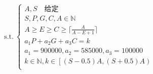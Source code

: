 \documentclass[preview]{standalone}
\begin{document}
\begin{align*}
\text{s.t.}~\begin{cases}A, S \quad \text{给定} \\S, P, G, C, A \in \mathbb{N} \\A \geq E \geq C \geq \lceil \frac{A}{A - E + 1} \rceil \\a_1 P + a_2 G + a_3 C = k \\a_1 = 900000, a_2 = 585000, a_3 = 100000 \\k \in \mathbb{N}, k \in \left[ (S - 0.5)A, (S + 0.5)A \right) \\\end{cases}
\end{align*}
\end{document}
